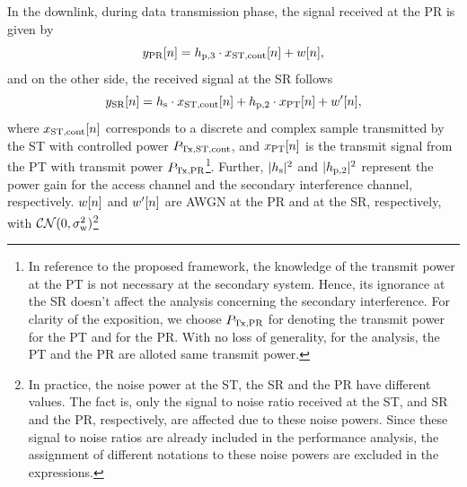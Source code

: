 In the downlink, during data transmission phase, the signal received at the PR is given by
\begin{equation}
y_{\text{PR}}[n] = h_{\text{p,3}}  \cdot x_{\text{ST,cont}}[n] + w[n],
\label{eq:sys_mod_pr}
\end{equation}
and on the other side, the received signal at the SR follows 
\begin{equation}
y_{\text{SR}}[n] = h_{\text{s}} \cdot x_{\text{ST,cont}}[n] + h_{\text{p,2}} \cdot x_{\text{PT}}[n] + w'[n],
\label{eq:sys_mod_sr}
\end{equation}
where $x_{\text{ST,cont}}[n]$ corresponds to a discrete and complex sample transmitted by the ST with controlled power $P_{\text{Tx,ST,cont}}$, and $x_{\text{PT}}[n]$ is the transmit signal from the PT with transmit power $P_{\text{Tx,PR}}$\footnote{In reference to the proposed framework, the knowledge of the transmit power at the PT is not necessary at the secondary system. Hence, its ignorance at the SR doesn't affect the analysis concerning the secondary interference. For clarity of the exposition, we choose $P_{\text{Tx,PR}}$ for denoting the transmit power for the PT and for the PR. With no loss of generality, for the analysis, the PT and the PR are alloted same transmit power.}. Further, $|h_{\text{s}}|^2$ and $|h_{\text{p,2}}|^2$ represent the power gain for the access channel and the secondary interference channel, respectively. $w[n]$ and $w'[n]$ are AWGN at the PR and at the SR, respectively, with $\mathcal{CN}(0, \sigma^2_{\text{w}})$\footnote{In practice, the noise power at the ST, the SR and the PR have different values. The fact is, only the signal to noise ratio received at the ST, and SR and the PR, respectively, are affected due to these noise powers. Since these signal to noise ratios are already included in the performance analysis, the assignment of different notations to these noise powers are excluded in the expressions.} 


